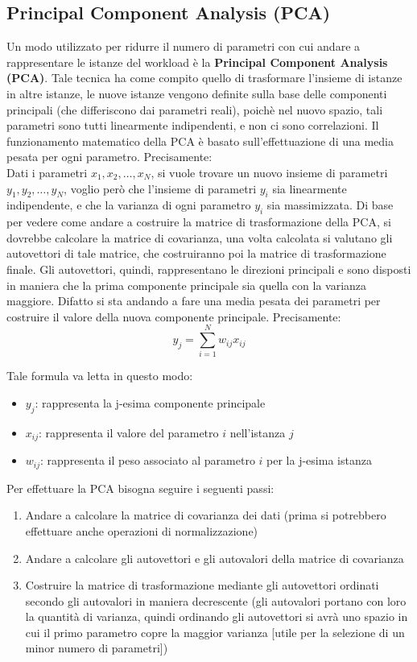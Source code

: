 \clearpage
\subsection{Principal Component Analysis (PCA)}
Un modo utilizzato per ridurre il numero di parametri con cui andare a rappresentare le istanze del workload è la \textbf{Principal Component Analysis (PCA)}. Tale tecnica ha come compito quello di trasformare l'insieme di istanze in altre istanze, le nuove istanze vengono definite sulla base delle componenti principali (che differiscono dai parametri reali), poichè nel nuovo spazio, tali parametri sono tutti linearmente indipendenti, e non ci sono correlazioni. Il funzionamento matematico della PCA è basato sull'effettuazione di una media pesata per ogni parametro. Precisamente:
\\
Dati i parametri \({x_1,x_2,\dots,x_N}\), si vuole trovare un nuovo insieme di parametri \({y_1,y_2,\dots,y_N}\), voglio però che l'insieme di parametri \(y_i\) sia linearmente indipendente, e che la varianza di ogni parametro \(y_i\) sia massimizzata. Di base per vedere come andare a costruire la matrice di trasformazione della PCA, si dovrebbe calcolare la matrice di covarianza, una volta calcolata si valutano gli autovettori di tale matrice, che costruiranno poi la matrice di trasformazione finale. Gli autovettori, quindi, rappresentano le direzioni principali e sono disposti in maniera che la prima componente principale sia quella con la varianza maggiore. Difatto si sta andando a fare una media pesata dei parametri per costruire il valore della nuova componente principale. Precisamente:
\[
y_j = \sum_{i=1}^{N}w_{ij}x_{ij}
\]

Tale formula va letta in questo modo:
\begin{itemize}
    \item \textbf{\(y_j\)}: rappresenta la j-esima componente principale
    \item \textbf{\(x_{ij}\)}: rappresenta il valore del parametro \(i\) nell'istanza \(j\)
    \item \textbf{\(w_{ij}\)}: rappresenta il peso associato al parametro \(i\) per la j-esima istanza
\end{itemize}

Per effettuare la PCA bisogna seguire i seguenti passi:
\begin{enumerate}
    \item Andare a calcolare la matrice di covarianza dei dati (prima si potrebbero effettuare anche operazioni di normalizzazione)
    \item Andare a calcolare gli autovettori e gli autovalori della matrice di covarianza
    \item Costruire la matrice di trasformazione mediante gli autovettori ordinati secondo gli autovalori in maniera decrescente (gli autovalori portano con loro la quantità di varianza, quindi ordinando gli autovettori si avrà uno spazio in cui il primo parametro copre la maggior varianza [utile per la selezione di un minor numero di parametri])
\end{enumerate}

